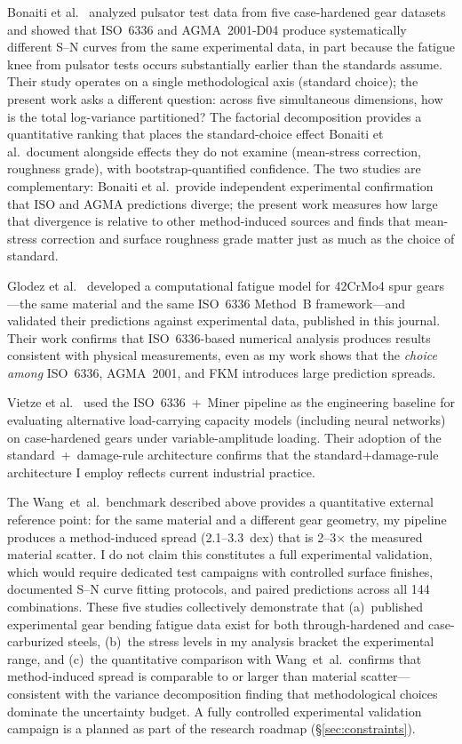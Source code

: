 \documentclass[12pt,a4paper]{article}
\begin{document}
Bonaiti et al.~\cite{bonaiti2024} analyzed pulsator test data from five
case-hardened gear datasets and showed that ISO~6336 and AGMA~2001-D04
produce systematically different S--N curves from the same experimental
data, in part because the fatigue knee from pulsator tests occurs
substantially earlier than the standards assume. Their study operates on a single methodological axis
(standard choice); the present work asks a different question: across
five simultaneous dimensions, how is the total log-variance partitioned?
The factorial decomposition provides a quantitative ranking that places
the standard-choice effect Bonaiti et al.\ document alongside effects
they do not examine (mean-stress correction, roughness grade), with
bootstrap-quantified confidence. The two studies are complementary:
Bonaiti et al.\ provide independent experimental confirmation that
ISO and AGMA predictions diverge; the present work measures how large
that divergence is relative to other method-induced sources and finds
that mean-stress correction and surface roughness grade matter just as
much as the choice of standard.

Glodez et al.~\cite{glodez2002} developed a computational fatigue
model for 42CrMo4 spur gears---the same material and the same
ISO~6336 Method~B framework---and validated their predictions against
experimental data, published in this journal. Their work confirms that
ISO~6336-based numerical analysis produces results consistent with
physical measurements, even as my work shows that the \emph{choice
among} ISO~6336, AGMA~2001, and FKM introduces large prediction spreads.

Vietze et al.~\cite{vietze2024} used the ISO~6336~+~Miner pipeline as the
engineering baseline for evaluating alternative load-carrying capacity
models (including neural networks) on case-hardened gears under
variable-amplitude loading. Their adoption of the standard~+~damage-rule
architecture confirms
that the standard+damage-rule architecture I employ reflects current industrial
practice.

The Wang~et~al.\ benchmark described above provides a quantitative
external reference point: for the same material and a different gear
geometry, my pipeline produces a method-induced spread (2.1--3.3~dex)
that is 2--3$\times$ the measured material scatter. I do not claim
this constitutes a full experimental validation, which would require
dedicated test campaigns with controlled surface finishes, documented
S--N curve fitting protocols, and paired predictions across all 144
combinations. These five studies collectively demonstrate that
(a)~published experimental gear bending fatigue data exist for both
through-hardened and case-carburized steels, (b)~the stress levels in
my analysis bracket the experimental range, and (c)~the quantitative
comparison with Wang~et~al.\ confirms that method-induced spread is
comparable to or larger than material scatter---consistent with the
variance decomposition finding that methodological choices dominate
the uncertainty budget. A fully controlled experimental validation
campaign is a planned as part of the research roadmap (\S\ref{sec:constraints}).
\end{document}
